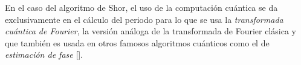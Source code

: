 En el caso del algoritmo de Shor, el uso de la computación cuántica se da exclusivamente en el cálculo del periodo para lo que se usa la \textit{transformada cuántica de Fourier}, la versión análoga de la transformada de Fourier clásica y que también es usada en otros famosos algoritmos cuánticos como el de \textit{estimación de fase} [\cite[221-225]{nielsen2001quantum}].